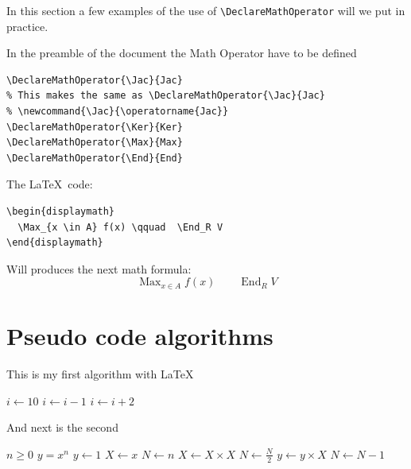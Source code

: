 \documentclass[12pt,a4paper]{article}
\theoremstyle{definition}
\theoremstyle{remark}
\DeclareMathOperator{\Jac}{Jac}
\DeclareMathOperator{\Ker}{Ker}
\DeclareMathOperator{\Max}{Max}
\DeclareMathOperator{\End}{End}
\begin{document}
In this section a few examples of the use of 
\verb|\DeclareMathOperator| will we put in practice.

In the preamble of the document the Math Operator have to be defined 
\begin{verbatim}
\DeclareMathOperator{\Jac}{Jac}
% This makes the same as \DeclareMathOperator{\Jac}{Jac}
% \newcommand{\Jac}{\operatorname{Jac}}
\DeclareMathOperator{\Ker}{Ker}
\DeclareMathOperator{\Max}{Max}
\DeclareMathOperator{\End}{End}
\end{verbatim}

\begin{center}
\begin{minipage}[c]{0.6\textwidth}
The \LaTeX \ code:
\begin{verbatim}
\begin{displaymath}
  \Max_{x \in A} f(x) \qquad  \End_R V 
\end{displaymath}
\end{verbatim}

Will produces the next math formula:
\begin{displaymath}
  \Max_{x\in A} f(x) \qquad  \End_R V 
\end{displaymath}
\end{minipage}
\end{center}



\section{Pseudo code algorithms}\label{sec:pseudo_code}

This is my first algorithm with \LaTeX

\begin{algorithmic}[1]
\State $i \gets 10$
    \State $i \gets i-1$
\Else
        \State $i \gets i+2$
    \EndIf
\EndIf 
\end{algorithmic}

\bigskip 
And next is the second
\begin{algorithmic}
\Require $n \geq 0$
\Ensure $y = x^n$
\State $y \gets 1$
\State $X \gets x$
\State $N \gets n$
    \State $X \gets X \times X$
    \State $N \gets \frac{N}{2}$  
    \State $y \gets y \times X$
    \State $N \gets N - 1$
\EndIf
\EndWhile
\end{algorithmic}
\end{document}
